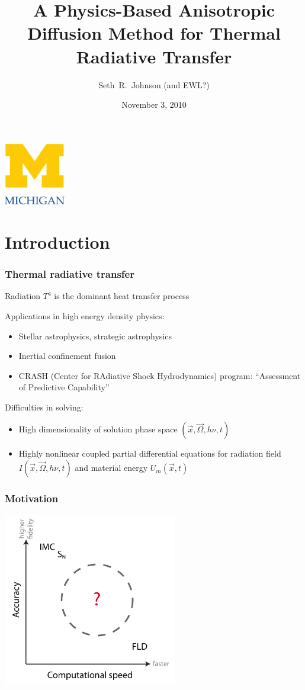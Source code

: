\documentclass{beamer}
\title[Prospectus]%
{A Physics-Based Anisotropic Diffusion Method for Thermal Radiative
Transfer}
\author[Seth~R.~Johnson]{Seth~R.~Johnson (and EWL?)}
\institute[UMich]{
University of Michigan, Ann Arbor
}
\date[11/3/2010]{November 3, 2010}
\begin{document}

\begin{frame}
\titlepage
\begin{center}
  \includegraphics[width=0.2\textwidth]{../figures/umlogo}
\end{center}
\end{frame}

\section{Introduction}
\begin{frame}
  \frametitle{Thermal radiative transfer}
  Radiation $T^4$ is the dominant heat transfer process

  Applications in high energy density physics:
  \begin{itemize}
    \item Stellar astrophysics, strategic astrophysics
    \item Inertial confinement fusion
    \item CRASH (Center for RAdiative Shock Hydrodynamics) program: ``Assessment
          of Predictive Capability''
  \end{itemize}
  Difficulties in solving:
  \begin{itemize}
    \item High dimensionality of solution phase space $(\vec{x}, \vec{\Omega},
      h\nu, t)$
    \item Highly nonlinear coupled partial differential equations for radiation
      field $I(\vec{x}, \vec{\Omega}, h\nu, t)$ and material energy $U_m(\vec{x}, t)$
  \end{itemize}
\end{frame}
\begin{frame}
  \frametitle{Motivation}
\begin{center}
  \includegraphics[width=3in]{../figures/fidelity}
\end{center}
\end{frame}
\end{document}
